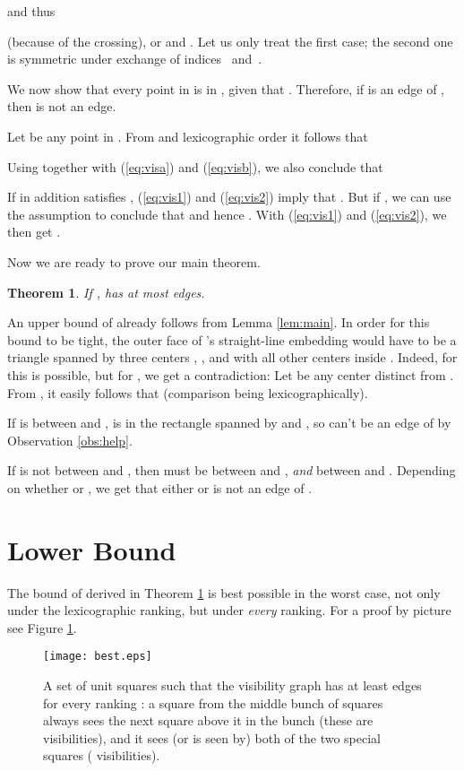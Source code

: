 \documentclass[fleqn,11pt]{article}
\newtheorem{theorem}[definition]{Theorem}
\newcommand{\proof}{\noindent{\bf Proof.} \hspace{1mm}}
\newcommand{\qed}{\hfill\usebox{\proofsymbol}}
\begin{document}
and thus 

(because of the crossing), or  and
. Let us only treat the first case; the second one
is symmetric under exchange of indices~ and~.

We now show that every point in  is in , given that . Therefore, if
 is an edge of , then
 is not an edge.

Let  be any point in . 
From 
and lexicographic order it follows that

Using  together with (\ref{eq:visa}) and
(\ref{eq:visb}), we also conclude that

If  in addition satisfies , (\ref{eq:vis1}) and
(\ref{eq:vis2}) imply that . But if , we can
use the assumption  to conclude that 
 and hence . With (\ref{eq:vis1}) and
(\ref{eq:vis2}), we then get .
\qed

Now we are ready to prove our main theorem.

\begin{theorem}\label{thm:main}
If ,  has at most  edges.
\end{theorem}

\proof An upper bound of  already follows from Lemma
\ref{lem:main}. In order for this bound to be tight, the outer face of
's straight-line embedding would have to be a
triangle  spanned by three centers
, , and with
all other centers inside . Indeed, for  this is possible,
but for , we get a contradiction: Let  be any center
distinct from . From , it easily follows that
 (comparison being lexicographically). 

If  is between  and ,  is in the rectangle spanned by
 and , so  can't be an edge of
 by Observation \ref{obs:help}.

If  is not between  and , then  must be between  and
, \emph{and} between  and . Depending on whether
 or , we get that either 
 or  is not an edge of .
\qed

\section{Lower Bound}
The bound of  derived in Theorem \ref{thm:main} is best possible
in the worst case, not only under the lexicographic ranking, but under
\emph{every} ranking. For a proof by picture see Figure \ref{fig:best}.

\begin{figure}[htb]
\begin{center}
\texttt{[image: best.eps]}
\end{center}
\caption{A set of  unit squares such that the visibility graph
   has at least  edges for every ranking : a
  square from the middle bunch of  squares always sees the next
  square above it in the bunch (these are  visibilities), and it
  sees (or is seen by) both of the two special squares (
  visibilities).\label{fig:best}}
\end{figure}
 
\end{document}
